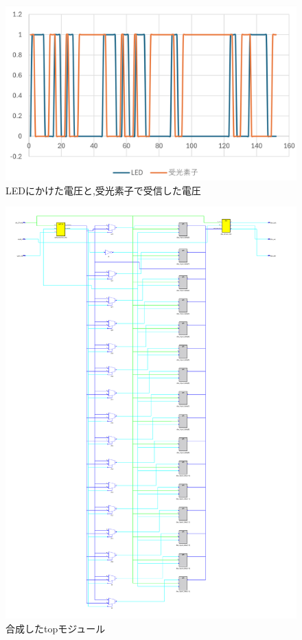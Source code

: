 \documentclass[a4paper,10pt]{article}
\begin{document}
\begin{figure}[H] %
  \centering
  \includegraphics[width=\linewidth]{hakei.png}
  \caption{LEDにかけた電圧と,受光素子で受信した電圧}
  \label{fig:hakei}
\end{figure}

\begin{figure}[H] %
  \centering
  \includegraphics[width=\linewidth]{top.pdf}
  \caption{合成したtopモジュール}
  \label{fig:top_module}
\end{figure}
\end{document}
